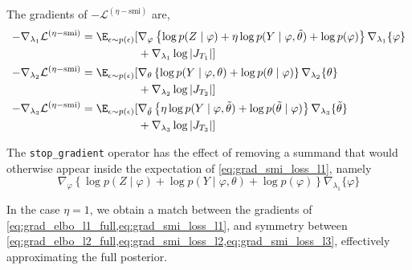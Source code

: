 The gradients of $-\mathcal{L}^{(\eta-\text{smi})}$ are,
\begin{align}
  -\nabla_{\lambda_1} \mathcal{L}^{(\eta-\text{smi})} = \E_{\epsilon \sim p(\epsilon)}[ & \nabla_{\varphi} \left\{ \log p(Z \mid \varphi) + \eta \log p(Y \mid \varphi, \tilde\theta) + \log p(\varphi) \right\} \nabla_{\lambda_1} \{ \varphi \} \nonumber    \\
                                                                                        & + \nabla_{\lambda_1} \log \left| J_{T_1} \right| ] \label{eq:grad_smi_loss_l1}                                                                                       \\
  -\nabla_{\lambda_2} \mathcal{L}^{(\eta-\text{smi})} = \E_{\epsilon \sim p(\epsilon)}[ & \nabla_{\theta} \left\{ \log p(Y \mid \varphi, \theta) + \log p(\theta \mid \varphi) \right\} \nabla_{\lambda_2} \{ \theta \} \nonumber                              \\
                                                                                        & + \nabla_{\lambda_2} \log \left| J_{T_2} \right| ] \label{eq:grad_smi_loss_l2}                                                                                       \\
  -\nabla_{\lambda_3} \mathcal{L}^{(\eta-\text{smi})} = \E_{\epsilon \sim p(\epsilon)}[ & \nabla_{\tilde\theta} \left\{ \eta \log p(Y \mid \varphi, \tilde\theta) + \log p(\tilde\theta \mid \varphi) \right\} \nabla_{\lambda_3} \{ \tilde\theta \} \nonumber \\
                                                                                        & + \nabla_{\lambda_3} \log \left| J_{T_3} \right| ] \label{eq:grad_smi_loss_l3}
\end{align}

The \texttt{stop\_gradient} operator has the effect of removing a summand that would otherwise appear inside the expectation of \cref{eq:grad_smi_loss_l1}, namely
\begin{equation*}
  \nabla_{\varphi} \left\{ \log p(Z \mid \varphi) + \log p(Y \mid \varphi, \theta) + \log p(\varphi) \right\} \nabla_{\lambda_1} \{ \varphi \}
\end{equation*}

In the case $\eta=1$, we obtain a match between the gradients of \cref{eq:grad_elbo_l1_full,eq:grad_smi_loss_l1}, and symmetry between \cref{eq:grad_elbo_l2_full,eq:grad_smi_loss_l2,eq:grad_smi_loss_l3}, effectively approximating the full posterior.

